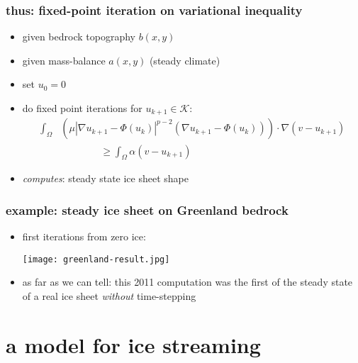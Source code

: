 \documentclass{beamer}
\begin{document}
\begin{frame}
  \frametitle{thus: fixed-point iteration on variational inequality} 

\begin{itemize}
\item given bedrock topography $b(x,y)$
\item given mass-balance $a(x,y)$ (steady climate)
\item set $u_0 = 0$
\item do fixed point iterations for $u_{k+1} \in \mathcal{K}$:
\begin{align*}
\int_{\Omega} &\left( \mu |\nabla u_{k+1} - \Phi(u_k)|^{p-2}
(\nabla u_{k+1} - \Phi(u_k) ) \right) \cdot \nabla (v - u_{k+1}) \\
&\qquad\qquad \ge \int_{\Omega} \alpha (v -  u_{k+1})
\end{align*}

\bigskip
\item \emph{computes}: steady state ice sheet shape
\end{itemize}
\end{frame}


\begin{frame}
  \frametitle{example: steady ice sheet on Greenland bedrock}

\begin{itemize}
\item first iterations from zero ice:

\begin{center}
\texttt{[image: greenland-result.jpg]}
\end{center}
\item as far as we can tell: this 2011 computation was the first of the steady state of a real ice sheet \emph{without} time-stepping
\end{itemize}
\end{frame}


\section[ice streams]{a model for ice streaming}
\end{document}

